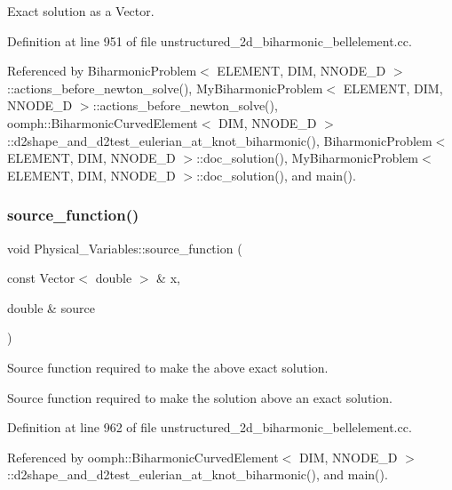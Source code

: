 Exact solution as a Vector. 



Definition at line 951 of file unstructured\+\_\+2d\+\_\+biharmonic\+\_\+bellelement.\+cc.



Referenced by Biharmonic\+Problem$<$ E\+L\+E\+M\+E\+N\+T, D\+I\+M, N\+N\+O\+D\+E\+\_\+D $>$\+::actions\+\_\+before\+\_\+newton\+\_\+solve(), My\+Biharmonic\+Problem$<$ E\+L\+E\+M\+E\+N\+T, D\+I\+M, N\+N\+O\+D\+E\+\_\+D $>$\+::actions\+\_\+before\+\_\+newton\+\_\+solve(), oomph\+::\+Biharmonic\+Curved\+Element$<$ D\+I\+M, N\+N\+O\+D\+E\+\_\+D $>$\+::d2shape\+\_\+and\+\_\+d2test\+\_\+eulerian\+\_\+at\+\_\+knot\+\_\+biharmonic(), Biharmonic\+Problem$<$ E\+L\+E\+M\+E\+N\+T, D\+I\+M, N\+N\+O\+D\+E\+\_\+D $>$\+::doc\+\_\+solution(), My\+Biharmonic\+Problem$<$ E\+L\+E\+M\+E\+N\+T, D\+I\+M, N\+N\+O\+D\+E\+\_\+D $>$\+::doc\+\_\+solution(), and main().

\mbox{\label{namespacePhysical__Variables_ae11027d76c5f512b7db6a1b6d17dc792}} 
\subsubsection{\texorpdfstring{source\+\_\+function()}{source\_function()}}
{\footnotesize\ttfamily void Physical\+\_\+\+Variables\+::source\+\_\+function (\begin{DoxyParamCaption}\item[{const Vector$<$ double $>$ \&}]{x,  }\item[{double \&}]{source }\end{DoxyParamCaption})}



Source function required to make the above exact solution. 

Source function required to make the solution above an exact solution. 

Definition at line 962 of file unstructured\+\_\+2d\+\_\+biharmonic\+\_\+bellelement.\+cc.



Referenced by oomph\+::\+Biharmonic\+Curved\+Element$<$ D\+I\+M, N\+N\+O\+D\+E\+\_\+D $>$\+::d2shape\+\_\+and\+\_\+d2test\+\_\+eulerian\+\_\+at\+\_\+knot\+\_\+biharmonic(), and main().

